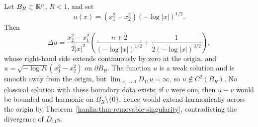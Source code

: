 \begin{example}\label{hanlin:weaksol-part1-example-3-12}
Let $B_R\subset\mathbb{R}^n$, $R<1$, and set
\[
u(x)=(x_1^2-x_2^2)(-\log|x|)^{1/2}.
\]
Then
\[
\Delta u=
\frac{x_2^2-x_1^2}{2|x|^2}
\left(\frac{n+2}{(-\log|x|)^{1/2}}
+\frac{1}{2(-\log|x|)^{3/2}}\right),
\]
whose right-hand side extends continuously by zero at the origin, and
$u=\sqrt{-\log R}(x_1^2-x_2^2)$ on $\partial B_R$. The function $u$ is a
weak solution and is smooth away from the origin, but
$\lim_{|x|\to0}D_{11}u=\infty$, so $u\notin C^2(B_R)$. No classical
solution with these boundary data exists: if $v$ were one, then $u-v$ would
be bounded and harmonic on $B_R\setminus\{0\}$, hence would extend
harmonically across the origin by
Theorem~\ref{hanlin:thm-removable-singularity}, contradicting the divergence
of $D_{11}u$.
\end{example}
